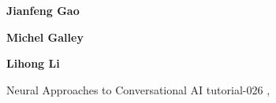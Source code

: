 \begin{bio}
{\bfseries Jianfeng Gao} 

{\bfseries Michel Galley} 

{\bfseries Lihong Li} 

\end{bio}

\begin{tutorial}
  {Neural Approaches to Conversational AI}
  {tutorial-026}
  {\daydateyear, \tutorialmorningtime}
  {\TutLocB}


\end{tutorial}
